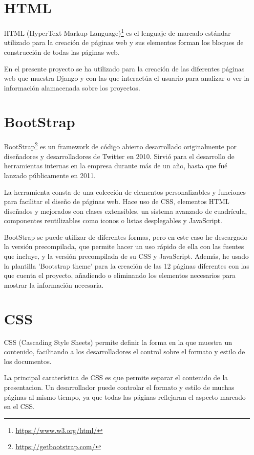 \documentclass[a4paper, 12pt]{book}
\begin{document}
\section{HTML} 
\label{sec:seccion6}
HTML (HyperText Markup Language)\footnote{\url{https://www.w3.org/html/}} es el lenguaje de marcado estándar utilizado para la creación de páginas web y sus elementos forman los bloques de construcción de todas las páginas web.~\cite{robson:_html_css}

En el presente proyecto se ha utilizado para la creación de las diferentes páginas web que muestra Django y con las que interactúa el usuario para analizar o ver la información alamacenada sobre los proyectos.

\section{BootStrap} 
\label{sec:seccion7}
BootStrap\footnote{\url{https://getbootstrap.com/}} es un framework de código abierto desarrollado originalmente por diseñadores y desarrolladores de Twitter en 2010. Sirvió para el desarrollo de herramientas internas en la empresa durante más de un año, hasta que fué lanzado públicamente en 2011.

La herramienta consta de una colección de elementos personalizables y funciones para facilitar el diseño de páginas web. Hace uso de CSS, elementos HTML diseñados y mejorados con clases extensibles, un sistema avanzado de cuadrícula, componentes reutilizables como iconos o listas desplegables y JavaScript.

BootStrap se puede utilizar de diferentes formas, pero en este caso he descargado la versión precompilada, que permite hacer un uso rápido de ella con las fuentes que incluye, y la versión precompilada de su CSS y JavaScript. Además, he usado la plantilla 'Bootstrap theme' para la creación de las 12 páginas diferentes con las que cuenta el proyecto, añadiendo o eliminando los elementos necesarios para mostrar la información necesaria.

\section{CSS} 
\label{sec:seccion8}
CSS (Cascading Style Sheets) permite definir la forma en la que muestra un contenido, facilitando a los desarrolladores el control sobre el formato y estilo de los documentos.~\cite{robson:_html_css}

La principal caraterística de CSS es que permite separar el contenido de la presentacion. Un desarrollador puede controlar el formato y estilo de muchas páginas al mismo tiempo, ya que todas las páginas reflejaran el aspecto marcado en el CSS.
    
\end{document}
